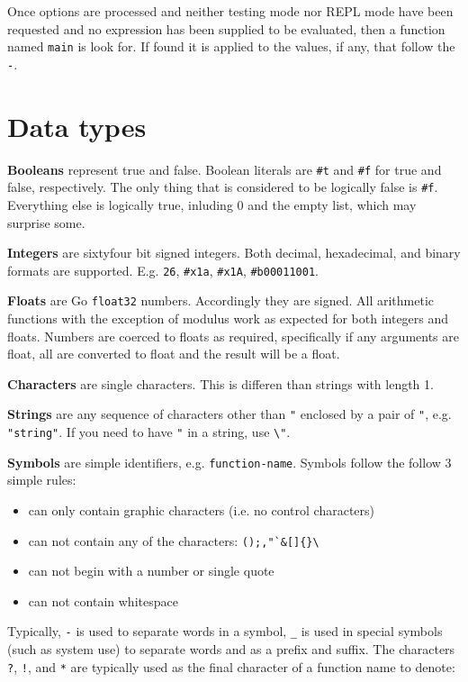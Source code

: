 \documentclass{article}
\begin{document}
Once options are processed and neither testing mode nor REPL mode have been requested and no
expression has been supplied to be evaluated, then a
function named \verb|main| is look for. If found it is applied to the values, if any, that
follow the \verb|-|.

\section{Data types}\label{sec:data-types}

\textbf{Booleans} represent true and false. Boolean literals are \verb|#t| and \verb|#f|
for true and false, respectively. The only thing that is considered to be logically false is
\verb|#f|. Everything else is logically true, inluding 0 and the empty list, which may
surprise some.

\textbf{Integers} are sixtyfour bit signed integers. Both decimal, hexadecimal, and binary
formats are supported. E.g. \verb|26|, \verb|#x1a|, \verb|#x1A|, \verb|#b00011001|.

\textbf{Floats} are Go \verb|float32| numbers. Accordingly they are signed. All arithmetic
functions with the exception of modulus work as expected for both integers and floats. Numbers
are coerced to floats as required, specifically if any arguments are float, all are converted
to float and the result will be a float.

\textbf{Characters} are single characters. This is differen than strings with length 1.

\textbf{Strings} are any sequence of characters other than \verb|"| enclosed by a pair of
\verb|"|, e.g. \verb|"string"|. If you need to have \verb|"| in a string, use
\verb|\"|.

\textbf{Symbols} are simple identifiers, e.g. \verb|function-name|. Symbols follow the
follow 3 simple rules:

\begin{itemize}
\item can only contain graphic characters (i.e. no control characters)
\item can not contain any of the characters: \verb|();,"`&[]{}\|
\item can not begin with a number or single quote
\item can not contain whitespace
\end{itemize}

Typically, \verb|-| is used to separate words in a symbol, \verb|_| is used in special
symbols (such as system use) to separate words and as a prefix and suffix. The characters
\verb|?|, \verb|!|, and \verb|*| are typically used as the final character of a function
name to denote:
\end{document}
